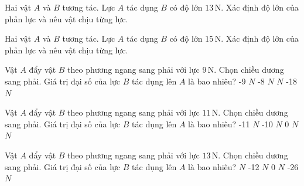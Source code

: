 \begin{bt}
Hai vật $A$ và $B$ tương tác. Lực $A$ tác dụng $B$ có độ lớn $13\,\text{N}$. Xác định độ lớn của phản lực và nêu vật chịu từng lực.
\end{bt}

\begin{bt}
Hai vật $A$ và $B$ tương tác. Lực $A$ tác dụng $B$ có độ lớn $15\,\text{N}$. Xác định độ lớn của phản lực và nêu vật chịu từng lực.
\end{bt}

\begin{ex}
Vật $A$ đẩy vật $B$ theo phương ngang sang phải với lực $9\,\text{N}$. Chọn chiều dương sang phải. Giá trị đại số của lực $B$ tác dụng lên $A$ là bao nhiêu?
\choice
{-9 $N$}
{-8 $N$}
{ $N$}
{-18 $N$}
\end{ex}

\begin{ex}
Vật $A$ đẩy vật $B$ theo phương ngang sang phải với lực $11\,\text{N}$. Chọn chiều dương sang phải. Giá trị đại số của lực $B$ tác dụng lên $A$ là bao nhiêu?
\choice
{-11 $N$}
{-10 $N$}
{0 $N$}
{ $N$}
\end{ex}

\begin{ex}
Vật $A$ đẩy vật $B$ theo phương ngang sang phải với lực $13\,\text{N}$. Chọn chiều dương sang phải. Giá trị đại số của lực $B$ tác dụng lên $A$ là bao nhiêu?
\choice
{ $N$}
{-12 $N$}
{0 $N$}
{-26 $N$}
\end{ex}

